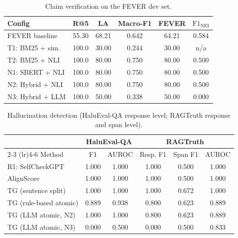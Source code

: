 
\begin{table}[t]
\centering
\caption{Claim verification on the FEVER dev set.}
\label{tab:fever}
\small
\begin{tabular}{lccccc}
\toprule
Config & R@5 & LA & Macro-F1 & FEVER & $\text{F1}_{\text{NEI}}$ \\
\midrule
FEVER baseline \cite{thorne2018fever} & 55.30 & 68.21 & 0.642 & 64.21 & 0.584 \\ %
T1: BM25 + sim. & 100.0 & 30.00 & 0.244 & 30.00 & n/a \\
T2: BM25 + NLI & 100.0 & 80.00 & 0.750 & 80.00 & 0.500 \\
N1: SBERT + NLI & 100.0 & 80.00 & 0.750 & 80.00 & 0.500 \\
N2: Hybrid + NLI & 100.0 & 80.00 & 0.750 & 80.00 & 0.500 \\
N3: Hybrid + LLM & 100.0 & 50.00 & 0.338 & 50.00 & 0.000 \\
\bottomrule
\end{tabular}
\end{table}

\begin{table}[t]
\centering
\caption{Hallucination detection (HaluEval-QA response level; RAGTruth response and span level).}
\label{tab:detection}
\small
\begin{tabular}{lccccc}
\toprule
& \multicolumn{2}{c}{HaluEval-QA} & \multicolumn{3}{c}{RAGTruth} \\
\cmidrule(lr){2-3} \cmidrule(lr){4-6}
Method & F1 & AUROC & Resp. F1 & Span F1 & AUROC \\
\midrule
R1: SelfCheckGPT & 1.000 & 1.000 & 1.000 & 0.500 & 1.000 \\
AlignScore & 1.000 & 1.000 & 1.000 & 0.500 & 1.000 \\
TG (sentence split) & 1.000 & 1.000 & 1.000 & 0.672 & 1.000 \\
TG (rule-based atomic) & 0.889 & 0.938 & 0.800 & 0.623 & 0.889 \\
TG (LLM atomic, N2) & 1.000 & 1.000 & 0.800 & 0.623 & 0.889 \\
TG (LLM atomic, N3) & 0.000 & 0.500 & 0.000 & 0.500 & 0.833 \\
\bottomrule
\end{tabular}
\end{table}
